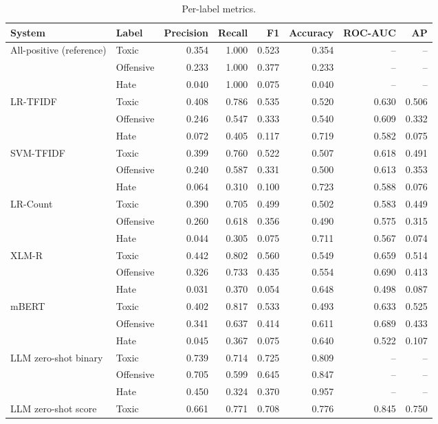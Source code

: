 \begin{table}[htbp]
\centering
\caption{Per-label metrics.}
\label{tab:labelmetrics}
\begin{tabular}{llrrrrrr}
\toprule
System & Label & Precision & Recall & F1 & Accuracy & ROC-AUC & AP \\
\midrule
All-positive (reference) & Toxic & 0.354 & 1.000 & 0.523 & 0.354 & -- & -- \\
 & Offensive & 0.233 & 1.000 & 0.377 & 0.233 & -- & -- \\
 & Hate & 0.040 & 1.000 & 0.075 & 0.040 & -- & -- \\
\midrule
LR-TFIDF & Toxic & 0.408 & 0.786 & 0.535 & 0.520 & 0.630 & 0.506 \\
 & Offensive & 0.246 & 0.547 & 0.333 & 0.540 & 0.609 & 0.332 \\
 & Hate & 0.072 & 0.405 & 0.117 & 0.719 & 0.582 & 0.075 \\
SVM-TFIDF & Toxic & 0.399 & 0.760 & 0.522 & 0.507 & 0.618 & 0.491 \\
 & Offensive & 0.240 & 0.587 & 0.331 & 0.500 & 0.613 & 0.353 \\
 & Hate & 0.064 & 0.310 & 0.100 & 0.723 & 0.588 & 0.076 \\
LR-Count & Toxic & 0.390 & 0.705 & 0.499 & 0.502 & 0.583 & 0.449 \\
 & Offensive & 0.260 & 0.618 & 0.356 & 0.490 & 0.575 & 0.315 \\
 & Hate & 0.044 & 0.305 & 0.075 & 0.711 & 0.567 & 0.074 \\
\midrule
XLM-R & Toxic & 0.442 & 0.802 & 0.560 & 0.549 & 0.659 & 0.514 \\
 & Offensive & 0.326 & 0.733 & 0.435 & 0.554 & 0.690 & 0.413 \\
 & Hate & 0.031 & 0.370 & 0.054 & 0.648 & 0.498 & 0.087 \\
mBERT & Toxic & 0.402 & 0.817 & 0.533 & 0.493 & 0.633 & 0.525 \\
 & Offensive & 0.341 & 0.637 & 0.414 & 0.611 & 0.689 & 0.433 \\
 & Hate & 0.045 & 0.367 & 0.075 & 0.640 & 0.522 & 0.107 \\
\midrule
LLM zero-shot binary & Toxic & 0.739 & 0.714 & 0.725 & 0.809 & -- & -- \\
 & Offensive & 0.705 & 0.599 & 0.645 & 0.847 & -- & -- \\
 & Hate & 0.450 & 0.324 & 0.370 & 0.957 & -- & -- \\
LLM zero-shot score & Toxic & 0.661 & 0.771 & 0.708 & 0.776 & 0.845 & 0.750 \\

\end{tabular}
\end{table}
